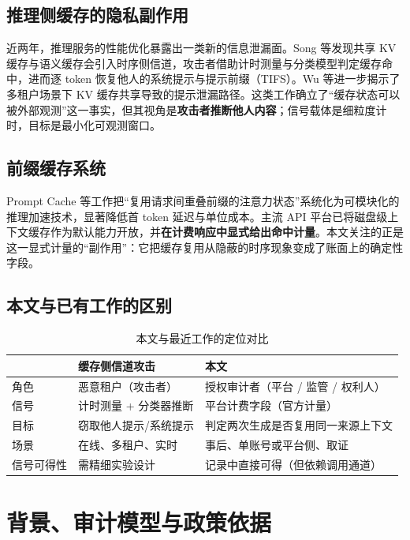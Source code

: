 \documentclass[11pt, a4paper]{ctexart}
\begin{document}
\subsection{推理侧缓存的隐私副作用}
近两年，推理服务的性能优化暴露出一类新的信息泄漏面。Song 等发现共享 KV 缓存与语义缓存会引入时序侧信道，攻击者借助计时测量与分类模型判定缓存命中，进而逐 token 恢复他人的系统提示与提示前缀（TIFS）\cite{song2025earlybird}。Wu 等进一步揭示了多租户场景下 KV 缓存共享导致的提示泄漏路径\cite{wu2025iknow}。这类工作确立了“缓存状态可以被外部观测”这一事实，但其视角是\textbf{攻击者推断他人内容}；信号载体是细粒度计时，目标是最小化可观测窗口。

\subsection{前缀缓存系统}
Prompt Cache 等工作把“复用请求间重叠前缀的注意力状态”系统化为可模块化的推理加速技术，显著降低首 token 延迟与单位成本\cite{gim2024promptcache}。主流 API 平台已将磁盘级上下文缓存作为默认能力开放，并\textbf{在计费响应中显式给出命中计量}。本文关注的正是这一显式计量的“副作用”：它把缓存复用从隐蔽的时序现象变成了账面上的确定性字段。

\subsection{本文与已有工作的区别}
\begin{table}[t]
\centering
\small
\caption{本文与最近工作的定位对比}
\label{tab:position}
\begin{tabular}{p{2.6cm} p{4.2cm} p{4.6cm}}
\toprule
 & 缓存侧信道攻击\cite{song2025earlybird,wu2025iknow} & 本文 \\
\midrule
角色 & 恶意租户（攻击者） & 授权审计者（平台 / 监管 / 权利人） \\
信号 & 计时测量 + 分类器推断 & 平台计费字段（官方计量） \\
目标 & 窃取他人提示/系统提示 & 判定两次生成是否复用同一来源上下文 \\
场景 & 在线、多租户、实时 & 事后、单账号或平台侧、取证 \\
信号可得性 & 需精细实验设计 & 记录中直接可得（但依赖调用通道） \\
\bottomrule
\end{tabular}
\end{table}

\section{背景、审计模型与政策依据}
\label{sec:background}
\end{document}
